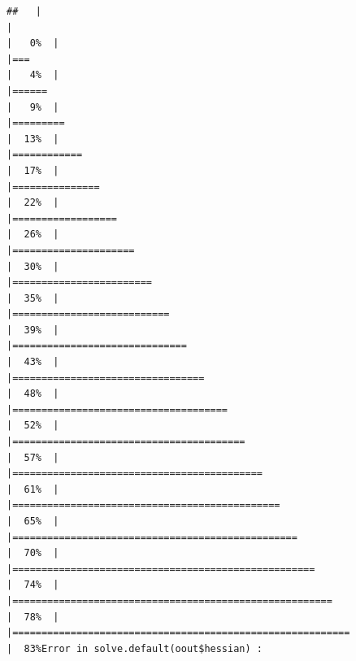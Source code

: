 \documentclass[
]{book}
\begin{document}
\begin{verbatim}
##   |                                                                              |                                                                      |   0%  |                                                                              |===                                                                   |   4%  |                                                                              |======                                                                |   9%  |                                                                              |=========                                                             |  13%  |                                                                              |============                                                          |  17%  |                                                                              |===============                                                       |  22%  |                                                                              |==================                                                    |  26%  |                                                                              |=====================                                                 |  30%  |                                                                              |========================                                              |  35%  |                                                                              |===========================                                           |  39%  |                                                                              |==============================                                        |  43%  |                                                                              |=================================                                     |  48%  |                                                                              |=====================================                                 |  52%  |                                                                              |========================================                              |  57%  |                                                                              |===========================================                           |  61%  |                                                                              |==============================================                        |  65%  |                                                                              |=================================================                     |  70%  |                                                                              |====================================================                  |  74%  |                                                                              |=======================================================               |  78%  |                                                                              |==========================================================            |  83%Error in solve.default(oout$hessian) : 

\end{verbatim}
\end{document}
